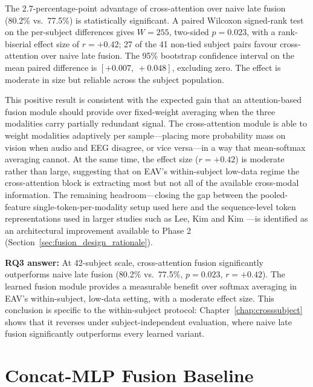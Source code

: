 The 2.7-percentage-point advantage of cross-attention over naive late fusion (80.2\% vs.\ 77.5\%) is statistically significant. A paired Wilcoxon signed-rank test on the per-subject differences gives $W = 255$, two-sided $p = 0.023$, with a rank-biserial effect size of $r = +0.42$; 27 of the 41 non-tied subject pairs favour cross-attention over naive late fusion. The 95\% bootstrap confidence interval on the mean paired difference is $[+0.007,\ +0.048]$, excluding zero. The effect is moderate in size but reliable across the subject population.

This positive result is consistent with the expected gain that an attention-based fusion module should provide over fixed-weight averaging when the three modalities carry partially redundant signal. The cross-attention module is able to weight modalities adaptively per sample---placing more probability mass on vision when audio and EEG disagree, or vice versa---in a way that mean-softmax averaging cannot. At the same time, the effect size ($r = +0.42$) is moderate rather than large, suggesting that on EAV's within-subject low-data regime the cross-attention block is extracting most but not all of the available cross-modal information. The remaining headroom---closing the gap between the pooled-feature single-token-per-modality setup used here and the sequence-level token representations used in larger studies such as Lee, Kim and Kim \cite{Lee2024MERCL}---is identified as an architectural improvement available to Phase 2 (Section~\ref{sec:fusion_design_rationale}).

\textbf{RQ3 answer:} At 42-subject scale, cross-attention fusion significantly outperforms naive late fusion (80.2\% vs.\ 77.5\%, $p = 0.023$, $r = +0.42$). The learned fusion module provides a measurable benefit over softmax averaging in EAV's within-subject, low-data setting, with a moderate effect size. This conclusion is specific to the within-subject protocol: Chapter~\ref{chap:crosssubject} shows that it reverses under subject-independent evaluation, where naive late fusion significantly outperforms every learned variant.

\section{Concat-MLP Fusion Baseline}
\label{sec:concat_mlp_results}

